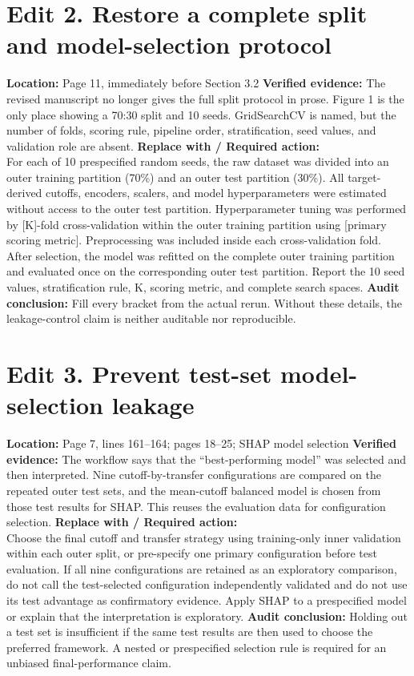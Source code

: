 \documentclass[11pt]{article}
\newcommand{\loc}[1]{\textbf{Location:} #1}
\newcommand{\current}[1]{\textbf{Verified evidence:} #1}
\newcommand{\replacewith}[1]{\textbf{Replace with / Required action:}\\{\color{blue}#1}}
\newcommand{\why}[1]{\textbf{Audit conclusion:} #1}
\begin{document}
\section*{Edit 2. Restore a complete split and model-selection protocol}
\loc{Page 11, immediately before Section 3.2}
\current{The revised manuscript no longer gives the full split protocol in prose. Figure 1 is the only place showing a 70:30 split and 10 seeds. GridSearchCV is named, but the number of folds, scoring rule, pipeline order, stratification, seed values, and validation role are absent.}
\replacewith{For each of 10 prespecified random seeds, the raw dataset was divided into an outer training partition (70\%) and an outer test partition (30\%). All target-derived cutoffs, encoders, scalers, and model hyperparameters were estimated without access to the outer test partition. Hyperparameter tuning was performed by [K]-fold cross-validation within the outer training partition using [primary scoring metric]. Preprocessing was included inside each cross-validation fold. After selection, the model was refitted on the complete outer training partition and evaluated once on the corresponding outer test partition. Report the 10 seed values, stratification rule, K, scoring metric, and complete search spaces.}
\why{Fill every bracket from the actual rerun. Without these details, the leakage-control claim is neither auditable nor reproducible.}

\section*{Edit 3. Prevent test-set model-selection leakage}
\loc{Page 7, lines 161--164; pages 18--25; SHAP model selection}
\current{The workflow says that the ``best-performing model'' was selected and then interpreted. Nine cutoff-by-transfer configurations are compared on the repeated outer test sets, and the mean-cutoff balanced model is chosen from those test results for SHAP. This reuses the evaluation data for configuration selection.}
\replacewith{Choose the final cutoff and transfer strategy using training-only inner validation within each outer split, or pre-specify one primary configuration before test evaluation. If all nine configurations are retained as an exploratory comparison, do not call the test-selected configuration independently validated and do not use its test advantage as confirmatory evidence. Apply SHAP to a prespecified model or explain that the interpretation is exploratory.}
\why{Holding out a test set is insufficient if the same test results are then used to choose the preferred framework. A nested or prespecified selection rule is required for an unbiased final-performance claim.}
\end{document}
